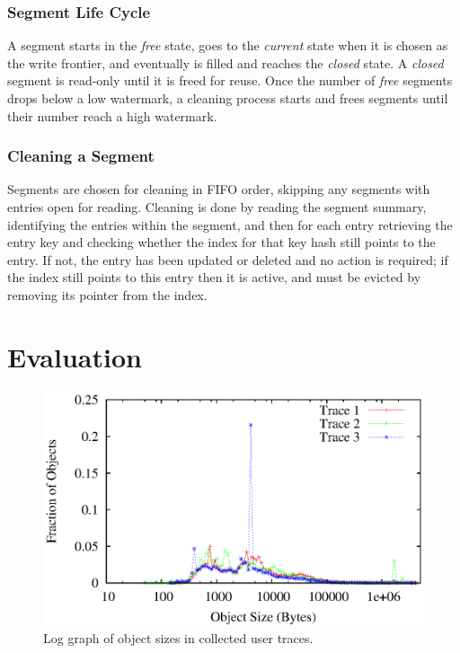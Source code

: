 \documentclass{sig-alternate}
\begin{document}
\subsubsection{Segment Life Cycle}
A segment starts in the \emph{free} state, goes to the \emph{current} state when
it is chosen as the write frontier, and eventually is filled and reaches the
\emph{closed} state.  A \emph{closed} segment is read-only until it is freed for
reuse.  Once the number of \emph{free} segments drops below a low watermark, a
cleaning process starts and frees segments until their number reach a high
watermark.

\subsubsection{Cleaning a Segment}
Segments are chosen for cleaning in FIFO order, skipping any segments with
entries open for reading. Cleaning is done by reading the segment summary,
identifying the entries within the segment, and then for each entry retrieving
the entry key and checking whether the index for that key hash still points to
the entry. If not, the entry has been updated or deleted and no action is
required; if the index still points to this entry then it is active, and must be
evicted by removing its pointer from the index.

\section{Evaluation}

\begin{figure}[t]
  \begin{center}
    \includegraphics[width=1.04\columnwidth]{graphs/log-size-dist}
  \end{center}
  \caption{Log graph of object sizes in collected user traces.}
  \label{fig:log-size-dist} 
\vspace{-0.2in}
\end{figure}
\end{document}
